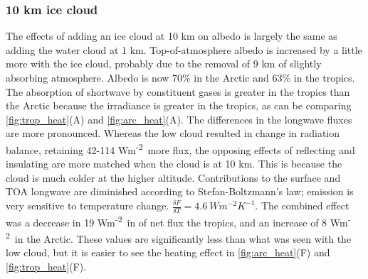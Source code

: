 \documentclass[twocol]{ametsoc}
\newcommand{\FU}{Wm\textsuperscript{-2}}
\begin{document}
\subsubsection{10 km ice cloud}
The effects of adding an ice cloud at 10 km on albedo is largely the same as adding the water cloud at 1 km. Top-of-atmosphere albedo is increased by a little more with the ice cloud, probably due to the removal of 9 km of slightly absorbing atmosphere. Albedo is now 70\% in the Arctic and 63\% in the tropics. The absorption of shortwave by constituent gases is greater in the tropics than the Arctic because the irradiance is greater in the tropics, as can be comparing \autoref{fig:trop_heat}(A) and \autoref{fig:arc_heat}(A). The differences in the longwave fluxes are more pronounced. Whereas the low cloud resulted in change in radiation balance, retaining 42-114 \FU~more flux, the opposing effects of reflecting and insulating are more matched when the cloud is at 10 km.  This is because the cloud is much colder at the higher altitude. Contributions to the surface and TOA longwave are diminished according to Stefan-Boltzmann's law; emission is very sensitive to temperature change. $\frac{\delta F}{\delta T} = 4.6~W m^{-2}K^{-1}$. The combined effect was a decrease in 19 \FU~in of net flux the tropics, and an increase of 8 \FU~in the Arctic. These values are significantly less than what was seen with the low cloud, but it is easier to see the heating effect in \autoref{fig:arc_heat}(F) and \autoref{fig:trop_heat}(F).
\end{document}
